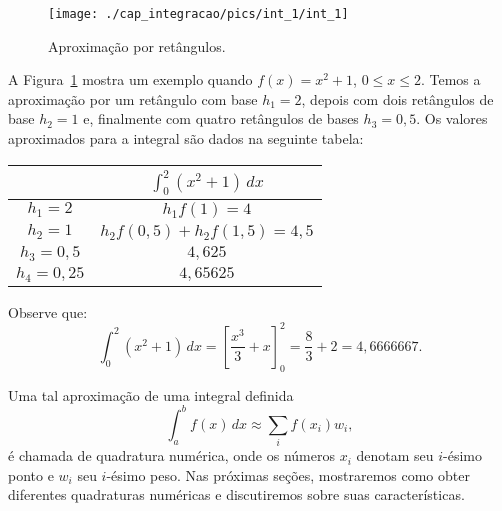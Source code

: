 \begin{figure}
  \centering
  \texttt{[image: ./cap\_integracao/pics/int\_1/int\_1]}
  \caption{Aproximação por retângulos.}
  \label{fig:int_101}
\end{figure}

\begin{ex}
A Figura~\ref{fig:int_101} mostra um exemplo quando $f(x)=x^2+1$, $0\leq x\leq 2$. Temos a aproximação por um retângulo com base $h_1=2$, depois com dois retângulos de base $h_2=1$ e, finalmente com quatro retângulos de bases $h_3=0,5$. Os valores aproximados para a integral são dados na seguinte tabela:
\begin{center}
  \begin{tabular}{|c|c|}\hline
    & $\displaystyle \int_0^2(x^2+1)\,dx$ \\ \hline
    $h_1=2$ & $h_1f(1)=4$ \\
    $h_2=1$ & $h_2f(0,5)+h_2f(1,5)=4,5$ \\
    $h_3=0,5$ & $4,625$ \\
    $h_4=0,25$ & $4,65625$ \\\hline
  \end{tabular}
\end{center}
Observe que:
\begin{equation}
  \int_0^2(x^2+1)\,dx = \left[\frac{x^3}{3}+x\right]_0^2 = \frac{8}{3}+2=4,6666667.
\end{equation}
\end{ex}


Uma tal aproximação de uma integral definida
\begin{equation}
  \int_a^b f(x)\,dx \approx \sum_{i} f(x_i)w_i,
\end{equation}
é chamada de quadratura numérica, onde os números $x_i$ denotam seu $i$-ésimo ponto e $w_i$ seu $i$-ésimo peso. Nas próximas seções, mostraremos como obter diferentes quadraturas numéricas e discutiremos sobre suas características.




